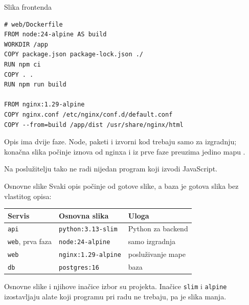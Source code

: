 \begin{frame}[fragile]{Slika frontenda}
\begin{lstlisting}
# web/Dockerfile
FROM node:24-alpine AS build
WORKDIR /app
COPY package.json package-lock.json ./
RUN npm ci
COPY . .
RUN npm run build

FROM nginx:1.29-alpine
COPY nginx.conf /etc/nginx/conf.d/default.conf
COPY --from=build /app/dist /usr/share/nginx/html
\end{lstlisting}

\vspace{0.3em}
Opis ima dvije faze. Node, paketi i izvorni kod trebaju samo za izgradnju; konačna slika počinje iznova od nginxa i iz prve faze preuzima jedino mapu .

\vspace{0.3em}
Na poslužitelju tako ne radi nijedan program koji izvodi JavaScript.
\end{frame}

\begin{frame}{Osnovne slike}
Svaki opis počinje od gotove slike, a baza je gotova slika bez vlastitog opisa:

\vspace{0.5em}
\begin{center}
{\small
\setlength{\tabcolsep}{6pt}
\renewcommand{\arraystretch}{1.35}
\begin{tabular}{@{}L{2.8cm}L{3.6cm}L{4.6cm}@{}}
  \toprule
  \textbf{Servis} & \textbf{Osnovna slika} & \textbf{Uloga} \\
  \midrule
  \texttt{api} & \texttt{python:3.13-slim} & Python za backend \\
  \texttt{web}, prva faza & \texttt{node:24-alpine} & samo izgradnja \\
  \texttt{web} & \texttt{nginx:1.29-alpine} & posluživanje mape  \\
  \texttt{db} & \texttt{postgres:16} & baza \\
  \bottomrule
\end{tabular}
}
\end{center}

\vspace{0.6em}
\begin{konvencija}
Osnovne slike i njihove inačice izbor su projekta. Inačice \texttt{slim} i \texttt{alpine} izostavljaju alate koji programu pri radu ne trebaju, pa je slika manja.
\end{konvencija}
\end{frame}

